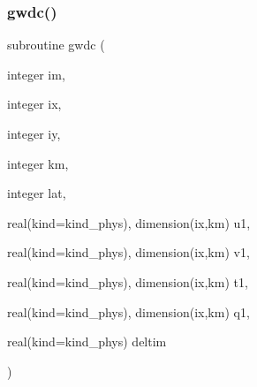 \subsubsection{\texorpdfstring{gwdc()}{gwdc()}}
{\footnotesize\ttfamily subroutine gwdc (\begin{DoxyParamCaption}\item[{integer}]{im,  }\item[{integer}]{ix,  }\item[{integer}]{iy,  }\item[{integer}]{km,  }\item[{integer}]{lat,  }\item[{real(kind=kind\+\_\+phys), dimension(ix,km)}]{u1,  }\item[{real(kind=kind\+\_\+phys), dimension(ix,km)}]{v1,  }\item[{real(kind=kind\+\_\+phys), dimension(ix,km)}]{t1,  }\item[{real(kind=kind\+\_\+phys), dimension(ix,km)}]{q1,  }\item[{real(kind=kind\+\_\+phys)}]{deltim }\end{DoxyParamCaption})}



